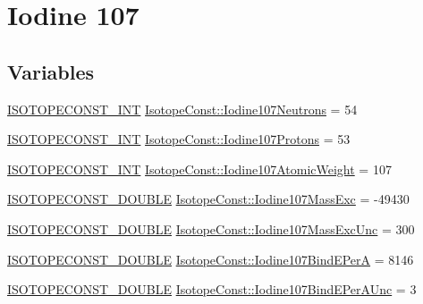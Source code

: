 \hypertarget{group___isotope_const-_iodine-_i107}{}\section{Iodine 107}
\label{group___isotope_const-_iodine-_i107}
\subsection*{Variables}
\begin{DoxyCompactItemize}
\item 
\mbox{\hyperlink{group___isotope_const-_macros_ga5f18360b3e99483a35c32d789e62621c}{I\+S\+O\+T\+O\+P\+E\+C\+O\+N\+S\+T\+\_\+\+I\+NT}} \mbox{\hyperlink{group___isotope_const-_iodine-_i107_gafe3f6bcc045cc61716a012df3605f8cb}{Isotope\+Const\+::\+Iodine107\+Neutrons}} = 54
\item 
\mbox{\hyperlink{group___isotope_const-_macros_ga5f18360b3e99483a35c32d789e62621c}{I\+S\+O\+T\+O\+P\+E\+C\+O\+N\+S\+T\+\_\+\+I\+NT}} \mbox{\hyperlink{group___isotope_const-_iodine-_i107_ga262b618b3d0b0fbc5be97ea2f5d1434f}{Isotope\+Const\+::\+Iodine107\+Protons}} = 53
\item 
\mbox{\hyperlink{group___isotope_const-_macros_ga5f18360b3e99483a35c32d789e62621c}{I\+S\+O\+T\+O\+P\+E\+C\+O\+N\+S\+T\+\_\+\+I\+NT}} \mbox{\hyperlink{group___isotope_const-_iodine-_i107_gaee238e566455549028402dc5c253e641}{Isotope\+Const\+::\+Iodine107\+Atomic\+Weight}} = 107
\item 
\mbox{\hyperlink{group___isotope_const-_macros_ga8f45a7272ce02c0b4c65c44636ed719a}{I\+S\+O\+T\+O\+P\+E\+C\+O\+N\+S\+T\+\_\+\+D\+O\+U\+B\+LE}} \mbox{\hyperlink{group___isotope_const-_iodine-_i107_gad7959bfd6b2ee73d578870867ec7cc97}{Isotope\+Const\+::\+Iodine107\+Mass\+Exc}} = -\/49430
\item 
\mbox{\hyperlink{group___isotope_const-_macros_ga8f45a7272ce02c0b4c65c44636ed719a}{I\+S\+O\+T\+O\+P\+E\+C\+O\+N\+S\+T\+\_\+\+D\+O\+U\+B\+LE}} \mbox{\hyperlink{group___isotope_const-_iodine-_i107_ga8dc81be9e0fd7cfb99f8edb0fe81878c}{Isotope\+Const\+::\+Iodine107\+Mass\+Exc\+Unc}} = 300
\item 
\mbox{\hyperlink{group___isotope_const-_macros_ga8f45a7272ce02c0b4c65c44636ed719a}{I\+S\+O\+T\+O\+P\+E\+C\+O\+N\+S\+T\+\_\+\+D\+O\+U\+B\+LE}} \mbox{\hyperlink{group___isotope_const-_iodine-_i107_gacec71fc6a15be0e9b30db7d3270767cf}{Isotope\+Const\+::\+Iodine107\+Bind\+E\+PerA}} = 8146
\item 
\mbox{\hyperlink{group___isotope_const-_macros_ga8f45a7272ce02c0b4c65c44636ed719a}{I\+S\+O\+T\+O\+P\+E\+C\+O\+N\+S\+T\+\_\+\+D\+O\+U\+B\+LE}} \mbox{\hyperlink{group___isotope_const-_iodine-_i107_ga5a717ceeec7890f6b028056ca188c87a}{Isotope\+Const\+::\+Iodine107\+Bind\+E\+Per\+A\+Unc}} = 3

\end{DoxyCompactItemize}
